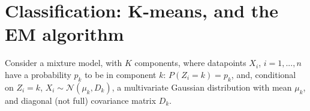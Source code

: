 \documentclass[a4paper, 11pt]{report}
\begin{document}

\maketitle

\chapter{Classification: K-means, and the EM algorithm}


Consider a mixture model, with $K$ components, where datapoints $X_i$, $i = 1, . . . , n$ have a probability $p_k$ to be in component $k$: $P(Z_i = k) = p_k$, and, conditional on $Z_i = k$, $X_i \sim \mathcal{N}(\mu_k,D_k)$, a multivariate Gaussian distribution with mean $\mu_k$, and diagonal (not full) covariance matrix $D_k$.
\end{document}
